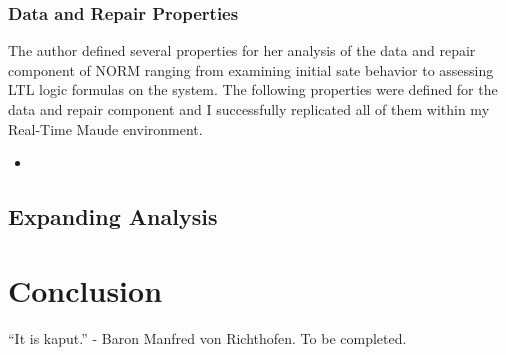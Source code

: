 \documentclass[10pt, journal]{IEEEtran}
\begin{document}
\subsubsection{Data and Repair Properties}

The author defined several properties for her analysis of the data and repair component of NORM ranging from examining initial sate behavior to assessing LTL logic formulas on the system. The following properties were defined for the data and repair component and I successfully replicated all of them within my Real-Time Maude environment.
\begin{itemize}
	\item 
	
\end{itemize}

\subsection{Expanding Analysis}


\section{Conclusion}
``It is kaput.'' - Baron Manfred von Richthofen. To be completed.



\end{document}
